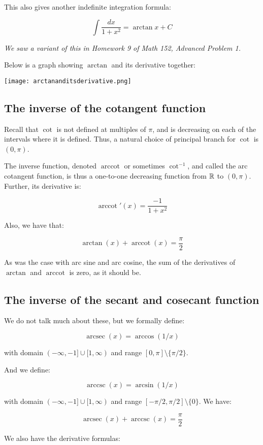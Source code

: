 \documentclass{amsart}
\newcommand{\arccot}{\operatorname{arccot}}
\begin{document}
This also gives another indefinite integration formula:

$$\int \frac{dx}{1 + x^2} = \arctan x + C$$

{\em We saw a variant of this in Homework 9 of Math 152, Advanced
Problem 1.}

Below is a graph showing $\arctan$ and its derivative together:

\texttt{[image: arctananditsderivative.png]}

\subsection{The inverse of the cotangent function}

Recall that $\cot$ is not defined at multiples of $\pi$, and is
decreasing on each of the intervals where it is defined. Thus, a
natural choice of principal branch for $\cot$ is $(0,\pi)$.

The inverse function, denoted $\arccot$ or sometimes $\cot^{-1}$, and
called the arc cotangent function, is thus a one-to-one decreasing
function from $\mathbb{R}$ to $(0,\pi)$. Further, its derivative is:

$$\arccot'(x) = \frac{-1}{1 + x^2}$$

Also, we have that:

$$\arctan(x) + \arccot(x) = \frac{\pi}{2}$$

As was the case with arc sine and arc cosine, the sum of the
derivatives of $\arctan$ and $\arccot$ is zero, as it should be.

\subsection{The inverse of the secant and cosecant function}

We do not talk much about these, but we formally define:

$$\operatorname{arcsec}(x) = \arccos(1/x)$$

with domain $(-\infty,-1] \cup [1,\infty)$ and range $[0,\pi]
\setminus \{ \pi/2 \}$.

And we define:

$$\operatorname{arccsc}(x) = \arcsin(1/x)$$

with domain $(-\infty,-1] \cup [1,\infty)$ and range $[-\pi/2,\pi/2]
\setminus \{ 0 \}$. We have:

$$\operatorname{arcsec}(x) + \operatorname{arccsc}(x) = \frac{\pi}{2}$$

We also have the derivative formulas:
\end{document}
